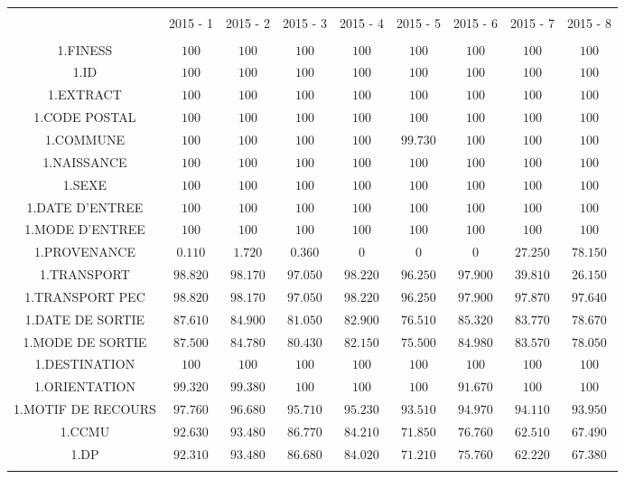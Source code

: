 \documentclass[]{article}
\begin{document}
\begin{table}[!htbp] \centering 
  \caption{} 
  \label{} 
\begin{tabular}{@{\extracolsep{5pt}} ccccccccc} 
\\[-1.8ex]\hline 
\hline \\[-1.8ex] 
 & 2015 - 1 & 2015 - 2 & 2015 - 3 & 2015 - 4 & 2015 - 5 & 2015 - 6 & 2015 - 7 & 2015 - 8 \\ 
\hline \\[-1.8ex] 
1.FINESS & $100$ & $100$ & $100$ & $100$ & $100$ & $100$ & $100$ & $100$ \\ 
1.ID & $100$ & $100$ & $100$ & $100$ & $100$ & $100$ & $100$ & $100$ \\ 
1.EXTRACT & $100$ & $100$ & $100$ & $100$ & $100$ & $100$ & $100$ & $100$ \\ 
1.CODE POSTAL & $100$ & $100$ & $100$ & $100$ & $100$ & $100$ & $100$ & $100$ \\ 
1.COMMUNE & $100$ & $100$ & $100$ & $100$ & $99.730$ & $100$ & $100$ & $100$ \\ 
1.NAISSANCE & $100$ & $100$ & $100$ & $100$ & $100$ & $100$ & $100$ & $100$ \\ 
1.SEXE & $100$ & $100$ & $100$ & $100$ & $100$ & $100$ & $100$ & $100$ \\ 
1.DATE D'ENTREE & $100$ & $100$ & $100$ & $100$ & $100$ & $100$ & $100$ & $100$ \\ 
1.MODE D'ENTREE & $100$ & $100$ & $100$ & $100$ & $100$ & $100$ & $100$ & $100$ \\ 
1.PROVENANCE & $0.110$ & $1.720$ & $0.360$ & $0$ & $0$ & $0$ & $27.250$ & $78.150$ \\ 
1.TRANSPORT & $98.820$ & $98.170$ & $97.050$ & $98.220$ & $96.250$ & $97.900$ & $39.810$ & $26.150$ \\ 
1.TRANSPORT PEC & $98.820$ & $98.170$ & $97.050$ & $98.220$ & $96.250$ & $97.900$ & $97.870$ & $97.640$ \\ 
1.DATE DE SORTIE & $87.610$ & $84.900$ & $81.050$ & $82.900$ & $76.510$ & $85.320$ & $83.770$ & $78.670$ \\ 
1.MODE DE SORTIE & $87.500$ & $84.780$ & $80.430$ & $82.150$ & $75.500$ & $84.980$ & $83.570$ & $78.050$ \\ 
1.DESTINATION & $100$ & $100$ & $100$ & $100$ & $100$ & $100$ & $100$ & $100$ \\ 
1.ORIENTATION & $99.320$ & $99.380$ & $100$ & $100$ & $100$ & $91.670$ & $100$ & $100$ \\ 
1.MOTIF DE RECOURS & $97.760$ & $96.680$ & $95.710$ & $95.230$ & $93.510$ & $94.970$ & $94.110$ & $93.950$ \\ 
1.CCMU & $92.630$ & $93.480$ & $86.770$ & $84.210$ & $71.850$ & $76.760$ & $62.510$ & $67.490$ \\ 
1.DP & $92.310$ & $93.480$ & $86.680$ & $84.020$ & $71.210$ & $75.760$ & $62.220$ & $67.380$ \\ 
\hline \\[-1.8ex] 
\end{tabular} 
\end{table}
\end{document}
